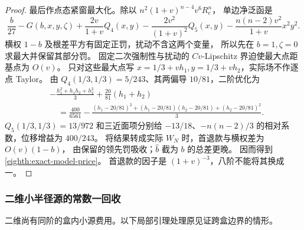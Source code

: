 \begin{proof}
最后作点态紧窗最大化。除以 \(n^2(1+v)^{n-4}v^6R_e^n\)，
单边净泛函是
\[
 \frac b{27}-G(b,x,y,\zeta)
 +\frac{2v}{1+v}Q_4(x,y)-\frac{2v^2}{(1+v)^2}Q_5(x,y)
 -\frac{n(n-2)v^2}{1+v}x^2y^2.
\]
横权 \(1-b\) 及根差平方有固定正罚，扰动不含这两个变量，
所以先在 \(b=1,\zeta=0\) 求最大并保留其部分罚。
固定二次强制性与扰动的 \(Cv\)-Lipschitz 界迫使最大点距基点为 \(O(v)\)。
只对这些最大点写 \(x=1/3+vh_1,y=1/3+vh_2\)，实际场不作逐点 Taylor。
由 \(Q_4(1/3,1/3)=5/243\)、其两偏导 \(10/81\)，二阶优化为
\[
 \begin{aligned}
 &-\frac{h_1^2+h_1h_2+h_2^2}{3}+\frac{20}{81}(h_1+h_2)\\
 &\quad=\frac{400}{6561}-\frac{(h_1-20/81)^2+(h_1-20/81)(h_2-20/81)
                         +(h_2-20/81)^2}{3}.
 \end{aligned}
\]
\(Q_5(1/3,1/3)=13/972\) 和三近面项分别给
\(-13/18\)、\(-n(n-2)/3\) 的相对系数，位移增益为 \(400/243\)。
将结果转成实际 \(W_N\) 时，首退款与横权差为 \(O(v)(1-b)\)，
由保留的领先罚吸收；\(\widehat b\) 截为 \(b\) 的总差更晚。
因而得到 \eqref{eighth:exact-model-price}。
首退款的因子是 \((1+v)^{-3}\)，八阶不能将其换成一。
\end{proof}

\subsubsection{二维小半径源的常数一回收}

二维尚有同阶的盒内小源费用。以下局部引理处理原见证跨盒边界的情形。


